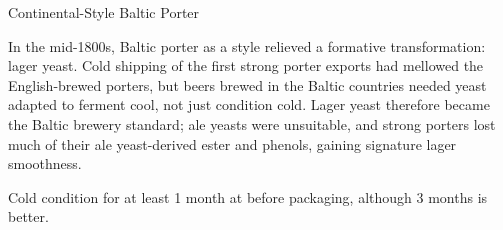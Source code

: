 \stylesection{\stylebalticporter}

\begin{recipie}{Continental-Style Baltic Porter}

\begin{aboutblock}
In the mid-1800s, Baltic porter as a style relieved a formative transformation:
lager yeast. Cold shipping of the first strong porter exports had mellowed the
English-brewed porters, but beers brewed in the Baltic countries needed yeast
adapted to ferment cool, not just condition cold. Lager yeast therefore became
the Baltic brewery standard; ale yeasts were unsuitable, and strong porters
lost much of their ale yeast-derived ester and phenols, gaining signature
lager smoothness.
\end{aboutblock}


\begin{methodandtiming}
 
\begin{mashsteps}
\end{mashsteps}

\begin{fermentationsteps}
\end{fermentationsteps}

\begin{directions}
Cold condition for at least 1 month at  before packaging, although
3 months is better.
\end{directions}

\end{methodandtiming}

\pagebreak

\begin{ingredientsblock}

\begin{malts}
\end{malts}


\end{ingredientsblock}
\end{recipie}
